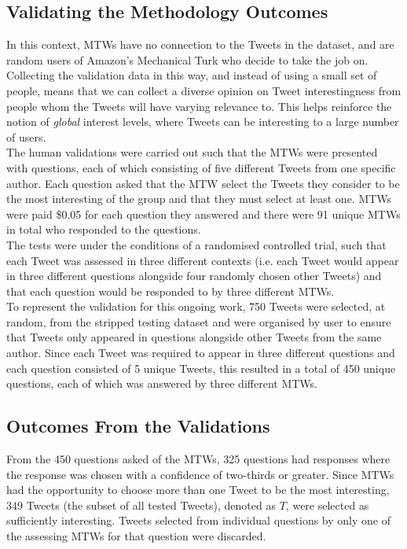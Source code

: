 \begin{enumerate}
\subsection{Validating the Methodology Outcomes}
In this context, MTWs have no connection to the Tweets in the dataset, and are random users of Amazon's Mechanical Turk who decide to take the job on. Collecting the validation data in this way, and instead of using a small set of people, means that we can collect a diverse opinion on Tweet interestingness from people whom the Tweets will have varying relevance to. This helps reinforce the notion of \textit{global} interest levels, where Tweets can be interesting to a large number of users.\\
The human validations were carried out such that the MTWs were presented with questions, each of which consisting of five different Tweets from one specific author. Each question asked that the MTW select the Tweets they consider to be the most interesting of the group and that they must select at least one. MTWs were paid \$0.05 for each question they answered and there were 91 unique MTWs in total who responded to the questions.\\
The tests were under the conditions of a randomised controlled trial, such that each Tweet was assessed in three different contexts (i.e. each Tweet would appear in three different questions alongside four randomly chosen other Tweets) and that each question would be responded to by three different MTWs.\\
To represent the validation for this ongoing work, 750 Tweets were selected, at random, from the stripped testing dataset and were organised by user to ensure that Tweets only appeared in questions alongside other Tweets from the same author. Since each Tweet was required to appear in three different questions and each question consisted of 5 unique Tweets, this resulted in a total of 450 unique questions, each of which was answered by three different MTWs.

\subsection{Outcomes From the Validations}
From the 450 questions asked of the MTWs, 325 questions had responses where the response was chosen with a confidence of two-thirds or greater. Since MTWs had the opportunity to choose more than one Tweet to be the most interesting, 349 Tweets (the subset of all tested Tweets), denoted as $T$, were selected as sufficiently interesting. Tweets selected from individual questions by only one of the assessing MTWs for that question were discarded.



\end{enumerate}
